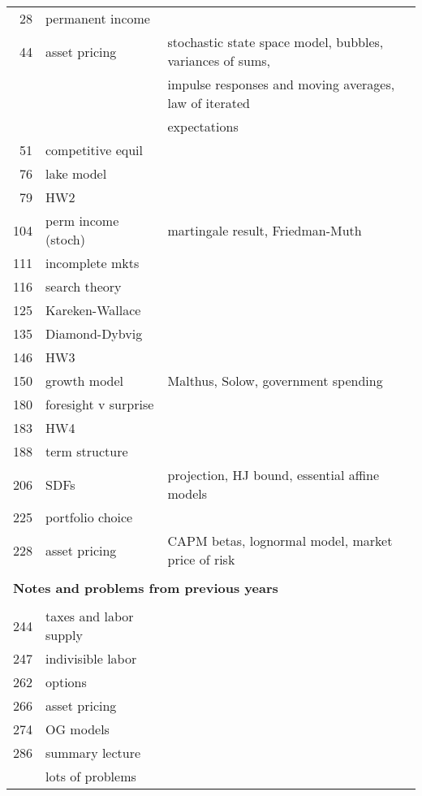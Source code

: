 \documentclass[11pt]{article}
\begin{document}
{\begin{tabular}{rll}
28      & permanent income  & \\
44      & asset pricing     & stochastic state space model, bubbles, variances of sums, \\
        &                   & impulse responses and moving averages, law of iterated    \\
        &                   & expectations \\
51      & competitive equil & \\
76      & lake model        & \\
79      & HW2       \\
104     & perm income (stoch) &  martingale result, Friedman-Muth \\
111     & incomplete mkts   & \\
116     & search theory     \\
125     & Kareken-Wallace   \\
135     & Diamond-Dybvig    \\
146     & HW3               \\
150     & growth model      &  Malthus, Solow, government spending \\
180     & foresight v surprise & \\
183     &  HW4         \\
188     & term structure  \\
206     & SDFs              & projection, HJ bound, essential affine models \\
225     & portfolio choice  & \\
228     & asset pricing     & CAPM betas, lognormal model, market price of risk  \\


& \\ \multicolumn{3}{l}{\bf Notes and problems from previous years}   \\ & \\
244     & taxes and labor supply \\
247     & indivisible labor \\
262     & options           \\
266     & asset pricing        \\
274     & OG models             \\
286     & summary lecture       \\
        & lots of problems \\

\bottomrule
\end{tabular}
}
\end{document}
